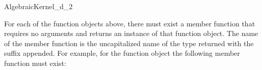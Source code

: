 \begin{ccRefConcept}{AlgebraicKernel_d_2}


\ccOperations

For each of the function objects above, there must exist a member function that requires no arguments and returns an instance of that function object. The name of the member function is the uncapitalized name of the type returned with the suffix  appended. For example, for the function object   the following member function must exist:


\ccSeeAlso

\\

\end{ccRefConcept}
